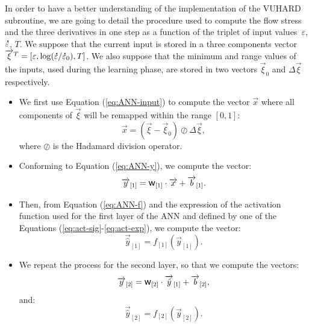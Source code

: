 \documentclass[algorithms,article,submit,pdftex,oneauthors]{Definitions/mdpi}
\DeclareRobustCommand{\w}{\mbox{\large\ensuremath{\mathsf{w}}}}
\DeclareRobustCommand{\lay}[1]{_{[#1]}}
\DeclareRobustCommand{\mdot}[1]{\accentset{\mbox{\bfseries .}}{#1}}
\begin{document}
In order to have a better understanding of the implementation of the VUHARD subroutine, we are going to detail the procedure used to compute the flow stress and the three derivatives in one step as a function of the triplet of input values~$\varepsilon$, $\mdot{\varepsilon}$, $T$.
We suppose that the current input is stored in a three components vector $\overrightarrow{\xi}^T=\left[\varepsilon, \log(\mdot{\varepsilon}/\mdot{\varepsilon}_{0}), T\right]$.
We also suppose that the minimum and range values of the inputs, used during the learning phase, are stored in two vectors $\overrightarrow{\xi}_{0}$ and $\Delta\overrightarrow{\xi}$ respectively.
\begin{itemize}
\item We first use Equation (\ref{eq:ANN-input}) to compute the vector $\overrightarrow{x}$ where all components of $\overrightarrow{\xi}$ will be remapped within the range $[0,1]$:
\begin{equation}
\overrightarrow{x}=\left(\overrightarrow{\xi}-\overrightarrow{\xi}_{0}\right)\oslash\Delta\overrightarrow{\xi}, \label{eq:ANNi1}
\end{equation}
where $\oslash$ is the Hadamard division operator.
\item Conforming to Equation (\ref{eq:ANN-y}), we compute the vector:
\begin{equation}
\overrightarrow{y}\lay{1}=\w\lay{1}\cdot\overrightarrow{x}+\overrightarrow{b}\lay{1}.\label{eq:ANNi2}
\end{equation}
\item Then, from Equation (\ref{eq:ANN-f}) and the expression of the activation function used for the first layer of the ANN and defined by one of the Equations (\ref{eq:act-sig}-\ref{eq:act-exp}), we compute the vector:
\begin{equation}
\overrightarrow{\hat{y}}\lay{1}=f\lay{1}(\overrightarrow{y}\lay{1}).\label{eq:ANNi3}
\end{equation}
\item We repeat the process for the second layer, so that we compute the vectors: \begin{equation}
\overrightarrow{y}\lay{2}=\w\lay{2}\cdot\overrightarrow{\hat{y}}\lay{1}+\overrightarrow{b}\lay{2},\label{eq:ANNi4}
\end{equation}
and:
\begin{equation}
\overrightarrow{\hat{y}}\lay{2}=f\lay{2}(\overrightarrow{y}\lay{2}).\label{eq:ANNi5}

\end{equation}
\end{itemize}
\end{document}
